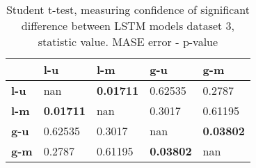 \begin{table}[H]
\centering
\caption{Student t-test, measuring confidence of significant difference between LSTM models dataset 3, statistic value. MASE error - p-value}
\label{table:ttest-p-values-lstm-experiments-MASE-dataset-3}
\begin{tabular}{lllll}
\toprule
{} &               l-u &               l-m &               g-u &               g-m \\
\midrule
\textbf{l-u} &               nan &  \textbf{0.01711} &           0.62535 &            0.2787 \\
\textbf{l-m} &  \textbf{0.01711} &               nan &            0.3017 &           0.61195 \\
\textbf{g-u} &           0.62535 &            0.3017 &               nan &  \textbf{0.03802} \\
\textbf{g-m} &            0.2787 &           0.61195 &  \textbf{0.03802} &               nan \\
\bottomrule
\end{tabular}
\end{table}
